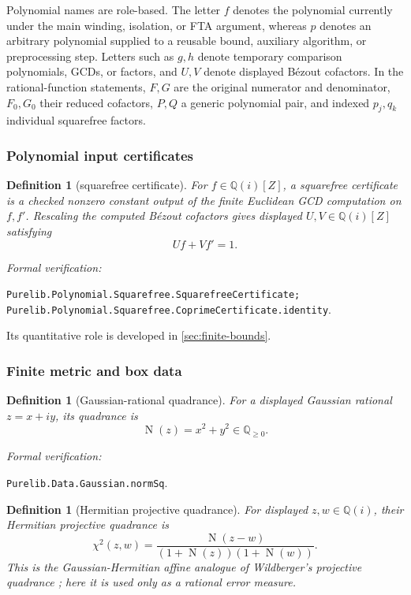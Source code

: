 \documentclass[11pt]{article}
\newtheorem{definition}[theorem]{Definition}
\newcommand{\Qi}{\mathbb{Q}(i)}
\newcommand{\Q}{\mathbb{Q}}
\newcommand{\Norm}[1]{\operatorname{N}\!\left(#1\right)}
\newcommand{\leanref}[1]{\par\smallskip\noindent
  \emph{Formal verification:}\par\nobreak
  {\raggedright\nolinkurl{#1}.\par}}
\begin{document}
Polynomial names are role-based.  The letter $f$ denotes the polynomial
currently under the main winding, isolation, or FTA argument, whereas $p$
denotes an arbitrary polynomial supplied to a reusable bound, auxiliary
algorithm, or preprocessing step.  Letters such as $g,h$ denote temporary
comparison polynomials, GCDs, or factors, and $U,V$ denote displayed Bézout
cofactors.  In the rational-function statements, $F,G$ are the original
numerator and denominator, $F_0,G_0$ their reduced cofactors, $P,Q$ a generic
polynomial pair, and indexed $p_j,q_k$ individual squarefree factors.

\subsubsection{Polynomial input certificates}

\begin{definition}[squarefree certificate]
\label{def:squarefree-certificate}
For $f\in\Qi[Z]$, a \emph{squarefree certificate} is a checked nonzero
constant output of the finite Euclidean GCD computation on $f,f'$.  Rescaling
the computed Bézout cofactors gives displayed $U,V\in\Qi[Z]$ satisfying
\[
                       Uf+Vf'=1.
\]
\end{definition}

\leanref{Purelib.Polynomial.Squarefree.SquarefreeCertificate;
Purelib.Polynomial.Squarefree.CoprimeCertificate.identity}

Its quantitative role is developed in \cref{sec:finite-bounds}.

\subsubsection{Finite metric and box data}

\begin{definition}[Gaussian-rational quadrance]
\label{def:quadrance}
For a displayed Gaussian rational $z=x+iy$, its \emph{quadrance} is
\[
             \Norm z=x^2+y^2\in\Q_{\ge0}.
\]
\end{definition}

\leanref{Purelib.Data.Gaussian.normSq}

\begin{definition}[Hermitian projective quadrance]
\label{def:hermitian-projective-quadrance}
For displayed $z,w\in\Qi$, their \emph{Hermitian projective quadrance} is
\begin{equation}
\label{eq:hermitian-projective-affine}
 \chi^2(z,w)=
 \frac{\Norm{z-w}}{(1+\Norm z)(1+\Norm w)}.
\end{equation}
This is the Gaussian-Hermitian affine analogue of Wildberger's projective
quadrance \cite{Wildberger}; here it is used only as a rational error measure.
\end{definition}
\end{document}
